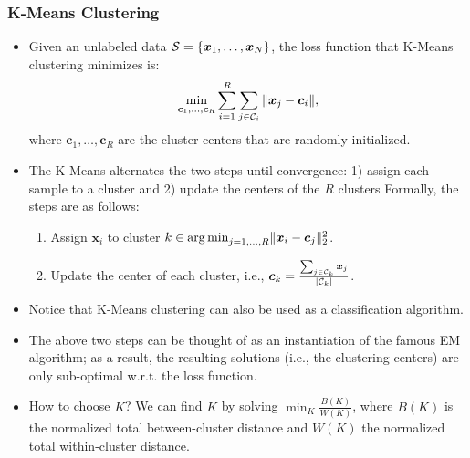     \subsubsection{K-Means Clustering}
        \begin{itemize}
             
            \item Given an unlabeled data $\mathcal{S}=\{ \bm{x}_1, \ldots, \bm{x}_N \}$, the loss function that K-Means clustering minimizes is:
            \begin{equation}
                \min_{\bm{c}_1, \ldots, \bm{c}_R} \sum_{i=1}^{R}{
                    \sum_{j \in \mathcal{C}_i}^{}{\lVert\bm{x}_j - \bm{c}_i\rVert}
                },
            \end{equation}
            where $\bm{c}_1, \ldots, \bm{c}_R$ are the cluster centers that are  randomly initialized.
            
            \item The K-Means alternates the two steps until convergence: 1) assign each sample to a cluster and 2) update the centers of the $R$ clusters
            Formally, the steps are as follows:
            \begin{enumerate}
                \item Assign $\bm{x}_i$ to cluster $k \in \operatorname{arg\,min}_{j=1,\ldots, R}\lVert\bm{x}_i - \bm{c}_j\rVert_2^2$.
                \item Update the center of each cluster, i.e., $\bm{c}_k = \frac{\sum_{j \in \mathcal{C}_k}^{}{\bm{x}_j}}{| \mathcal{C}_k |}$.
            \end{enumerate}
            \item Notice that K-Means clustering can also be used as a classification algorithm. 
            \item The above two steps can be thought of as an instantiation of the famous EM algorithm; as a result, the resulting solutions (i.e., the clustering centers) are only sub-optimal w.r.t. the loss function.
            \item How to choose $K$? We can find $K$ by solving $\min_{K} \frac{B(K)}{W(K)}$, where $B(K)$ is the normalized total between-cluster distance and $W(K)$ the normalized total within-cluster distance. 
        \end{itemize}
    
